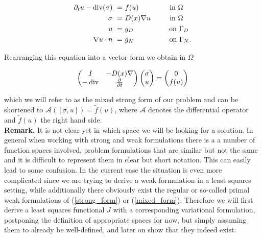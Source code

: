 \documentclass[../draft_1.tex]{subfiles}
\begin{document}
\begin{ceqn}
	\begin{equation}
	\begin{aligned}
	\label{mixed_form}
	 \partial_t u - \mathop{}\!\mathrm{div}(\sigma) \ =& \ f(u) \qquad \qquad \text{ in } \Omega \\
	\sigma \ =& \ D(x)  \nabla u \ \qquad \text{ in } \Omega  \\
	u \ =& \ g_D  \ \ \qquad  \qquad \text{ on } \Gamma_D \\
	\nabla u \cdot n \ =& \ g_N  \ \ \qquad \qquad \text{ on } \Gamma_N.
	\end{aligned}
	\end{equation}
\end{ceqn}
Rearranging this equation into a vector form we obtain in $\Omega$
\begin{ceqn}
	\begin{equation}
	\begin{pmatrix}
	I & - D(x) \nabla \\
	- \mathop{}\!\mathrm{div} & \frac{\partial}{\partial t} 
	\end{pmatrix}
	\begin{pmatrix}
	\sigma \\
	u
	\end{pmatrix} = 
	\begin{pmatrix}
	0 \\
	f(u)
	\end{pmatrix}
	\end{equation}
\end{ceqn}
which we will refer to as the mixed strong form of our problem and can be shortened to $\mathcal{A} ([\sigma, u]) = \tilde{f}(u)$, where $\mathcal{A}$ denotes the differential operator and $\tilde{f}(u)$ the right hand side. 
\smallskip
\\
\textbf{Remark.} It is not clear yet in which space we will be looking for a solution. In general when working with strong and weak formulations there is a a number of function spaces involved, problem formulations that are similar but not the same and it is difficult to represent them in clear but short notation. This can easily lead to some confusion. In the current case the situation is even more complicated since we are trying to derive a weak formulation in a least squares setting, while additionally there obviously exist the regular or so-called primal weak formulations of (\ref{strong_form}) or (\ref{mixed_form}). Therefore we will first derive a least squares functional $J$ with a corresponding variational formulation, postponing the definition of appropriate spaces for now, but simply assuming them to already be well-defined, and later on show that they indeed exist.
\end{document}
